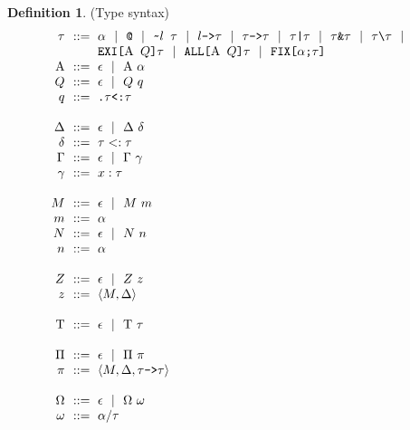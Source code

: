 \documentclass[acmsmall]{acmart}
\theoremstyle{definition}
\newtheorem{definition}{Definition}[section]
\begin{document}
\begin{definition} (Type syntax)
  \label{definition:type_syntax}
  \[\begin{array}[t]{r@{}l}
    \nonterm{\tau} & \is 
    \begin{array}[t]{@{}l}
      \code{$\alpha$} \sep 
      \code{@} \sep
      \code{\textasciitilde{}$l$ $\tau$} \sep 
      \code{$l$->$\tau$} \sep 
      \code{$\tau$->$\tau$} \sep
      \code{$\tau$|$\tau$} \sep
      \code{$\tau$\&$\tau$} \sep
      \code{$\tau$\textbackslash$\tau$} \sep 
      \\
      \code{EXI[$\mathrm{A}$ $Q$]$\tau$} \sep 
      \code{ALL[$\mathrm{A}$ $Q$]$\tau$} \sep 
      \code{FIX[$\alpha$;$\tau$]}
    \end{array}
    \\
    \nonterm{\mathrm{A}} & \is \epsilon \sep \mathrm{A}\ \alpha 
    \\
    \nonterm{Q} & \is \epsilon \sep Q\ q
    \\
    \nonterm{q} & \is \code{.$\tau$<:$\tau$} 
    \\
    \\
    \nonterm{\Delta} & \is \epsilon \sep \Delta\ \delta
    \\
    \nonterm{\delta} & \is \tau <: \tau 
    \\
    \nonterm{\Gamma} & \is \epsilon \sep \Gamma\ \gamma
    \\
    \nonterm{\gamma} & \is x : \tau
    \\
    \\
    \nonterm{M} & \is \epsilon \sep M\ m
    \\
    \nonterm{m} & \is \alpha
    \\
    \nonterm{N} & \is \epsilon \sep N\ n
    \\
    \nonterm{n} & \is \alpha
    \\
    \\
    \nonterm{Z} & \is \epsilon \sep Z\ z
    \\
    \nonterm{z} & \is \left< M, \Delta \right>
    \\
    \\
    \nonterm{\mathrm{T}} & \is \epsilon \sep \mathrm{T}\ \tau
    \\
    \\
    \nonterm{\mathrm{\Pi}} & \is \epsilon \sep \Pi\ \pi
    \\
    \nonterm{\pi} & \is \left< M, \Delta, \tau \code{->} \tau\right>
    \\
    \\
    \nonterm{\Omega} & \is \epsilon \sep \Omega\ \omega
    \\  
    \nonterm{\omega} & \is \alpha \slash \tau
  \end{array}\]
\end{definition}
\end{document}
